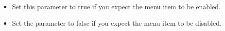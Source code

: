 
\begin{itemize}
\item Set this parameter to true if you expect the menu item to be enabled.
\item Set the parameter to false if you expect the menu item to be disabled. 
\end{itemize}
